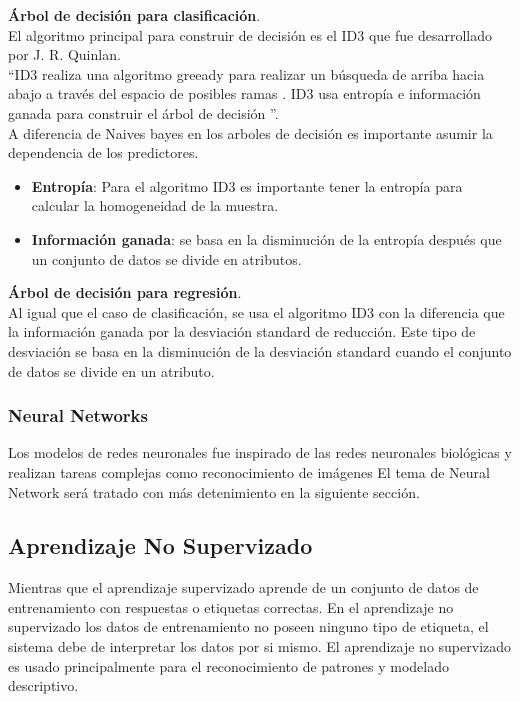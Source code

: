 \textbf{Árbol de decisión para clasificación}.\\
El algoritmo principal para construir de decisión es el ID3 que fue desarrollado por J. R. Quinlan.\\ \textquotedblleft ID3 realiza una algoritmo greeady para realizar un búsqueda de arriba hacia abajo a través del espacio de posibles ramas . ID3 usa entropía e información ganada para construir el árbol de decisión \textquotedblright.\\ A diferencia de Naives bayes en los arboles de decisión es importante asumir la dependencia de los predictores.\\
\begin{itemize}
	\item \textbf{Entropía}: Para el algoritmo ID3 es importante tener la entropía para calcular la homogeneidad de la muestra.
	\item \textbf{Información ganada}: se basa en la disminución de la entropía después que un conjunto de datos se divide en atributos.
\end{itemize}

\textbf{Árbol de decisión para regresión}.\\
Al igual que el caso de clasificación, se usa el algoritmo ID3 con la diferencia que la información ganada por la desviación standard de reducción. Este tipo de desviación se basa en la disminución de la desviación standard cuando el conjunto de datos se divide en un atributo.
\subsubsection*{Neural Networks}
Los modelos de redes neuronales fue inspirado de las redes neuronales biológicas y realizan tareas complejas como reconocimiento de imágenes
El tema de Neural Network será tratado con más detenimiento en la siguiente sección.
\subsection{Aprendizaje No Supervizado}
Mientras que el aprendizaje supervizado aprende  de un conjunto de datos de entrenamiento con respuestas o etiquetas correctas. En el aprendizaje no supervizado los datos de entrenamiento no poseen ninguno tipo de etiqueta, el sistema debe de interpretar los datos por si mismo.
El aprendizaje no supervizado es usado principalmente para el reconocimiento de patrones y modelado descriptivo.

